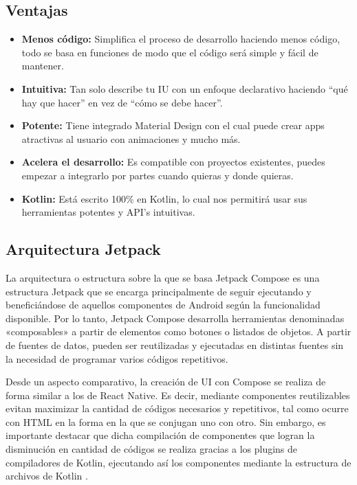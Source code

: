 \subsection*{Ventajas}

\begin{itemize}
	\item \textbf{Menos código:} Simplifica el proceso de desarrollo haciendo menos código, todo se basa en funciones de modo que el código será simple y fácil de mantener.
	\item \textbf{Intuitiva:} Tan solo describe tu IU con un enfoque declarativo haciendo “qué hay que hacer” en vez de “cómo se debe hacer”.
	\item \textbf{Potente:} Tiene integrado Material Design con el cual puede crear apps atractivas al usuario con animaciones y mucho más.
	\item \textbf{Acelera el desarrollo:} Es compatible con proyectos existentes, puedes empezar a integrarlo por partes cuando quieras y donde quieras.
	\item \textbf{Kotlin:} Está escrito 100\% en Kotlin, lo cual nos permitirá usar sus herramientas potentes y API’s intuitivas.
\end{itemize}

\subsection*{Arquitectura Jetpack}
La arquitectura o estructura sobre la que se basa Jetpack Compose es una estructura Jetpack que se encarga principalmente de seguir ejecutando y beneficiándose de aquellos componentes de Android según la funcionalidad disponible. Por lo tanto, Jetpack Compose desarrolla herramientas denominadas «composables» a partir de elementos como botones o listados de objetos. A partir de fuentes de datos, pueden ser reutilizadas y ejecutadas en distintas fuentes sin la necesidad de programar varios códigos repetitivos.

Desde un aspecto comparativo, la creación de UI con Compose se realiza de forma similar a los de React Native. Es decir, mediante componentes reutilizables evitan maximizar la cantidad de códigos necesarios y repetitivos, tal como ocurre con HTML en la forma en la que se conjugan uno con otro. Sin embargo, es importante destacar que dicha compilación de componentes que logran la disminución en cantidad de códigos se realiza gracias a los plugins de compiladores de Kotlin, ejecutando así los componentes mediante la estructura de archivos de Kotlin \cite{CitaA19}. 

